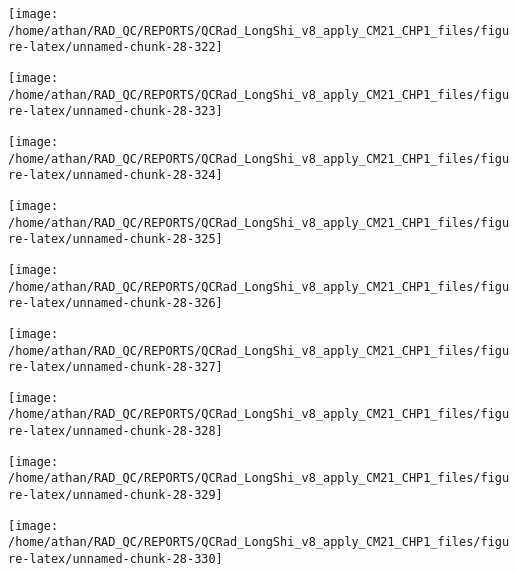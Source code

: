 \documentclass[
  10pt,
  a4paper,oneside]{article}
\begin{document}
\begin{center}\texttt{[image: /home/athan/RAD\_QC/REPORTS/QCRad\_LongShi\_v8\_apply\_CM21\_CHP1\_files/figure-latex/unnamed-chunk-28-322]} \end{center}

\begin{center}\texttt{[image: /home/athan/RAD\_QC/REPORTS/QCRad\_LongShi\_v8\_apply\_CM21\_CHP1\_files/figure-latex/unnamed-chunk-28-323]} \end{center}

\begin{center}\texttt{[image: /home/athan/RAD\_QC/REPORTS/QCRad\_LongShi\_v8\_apply\_CM21\_CHP1\_files/figure-latex/unnamed-chunk-28-324]} \end{center}

\begin{center}\texttt{[image: /home/athan/RAD\_QC/REPORTS/QCRad\_LongShi\_v8\_apply\_CM21\_CHP1\_files/figure-latex/unnamed-chunk-28-325]} \end{center}

\begin{center}\texttt{[image: /home/athan/RAD\_QC/REPORTS/QCRad\_LongShi\_v8\_apply\_CM21\_CHP1\_files/figure-latex/unnamed-chunk-28-326]} \end{center}

\begin{center}\texttt{[image: /home/athan/RAD\_QC/REPORTS/QCRad\_LongShi\_v8\_apply\_CM21\_CHP1\_files/figure-latex/unnamed-chunk-28-327]} \end{center}

\begin{center}\texttt{[image: /home/athan/RAD\_QC/REPORTS/QCRad\_LongShi\_v8\_apply\_CM21\_CHP1\_files/figure-latex/unnamed-chunk-28-328]} \end{center}

\begin{center}\texttt{[image: /home/athan/RAD\_QC/REPORTS/QCRad\_LongShi\_v8\_apply\_CM21\_CHP1\_files/figure-latex/unnamed-chunk-28-329]} \end{center}

\begin{center}\texttt{[image: /home/athan/RAD\_QC/REPORTS/QCRad\_LongShi\_v8\_apply\_CM21\_CHP1\_files/figure-latex/unnamed-chunk-28-330]} \end{center}
\end{document}
